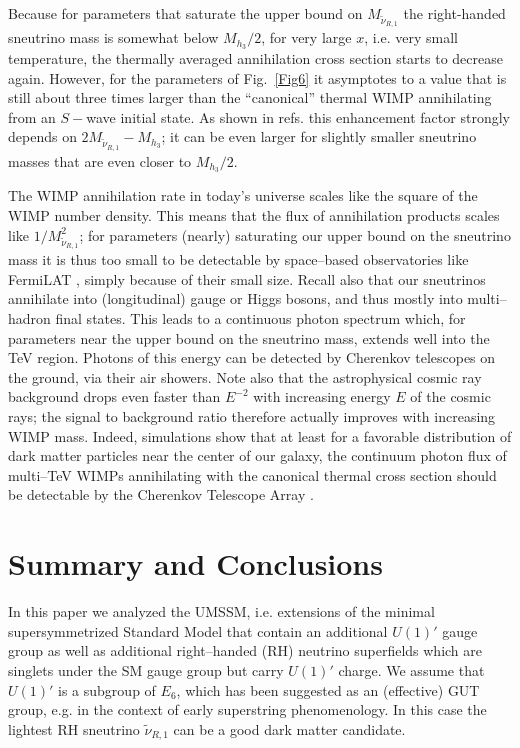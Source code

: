 \documentclass[a4paper,11pt]{article}
\begin{document}
Because for parameters that saturate the upper bound on $M_{\tilde{\nu}_{R,1}}$ the right-handed sneutrino mass is
somewhat below $M_{h_3}/2$, for very large $x$, i.e. very small
temperature, the thermally averaged annihilation cross section starts to
decrease again. However, for the parameters of Fig.~\ref{Fig6} it
asymptotes to a value that is still about three times larger than the
``canonical'' thermal WIMP annihilating from an $S-$wave initial state. As
shown in refs. \cite{Ibe:2008ye, Guo:2009aj} this enhancement factor
strongly depends on $2 M_{\tilde \nu_{R,1}} - M_{h_3}$; it can be even larger
for slightly smaller sneutrino masses that are even closer to $M_{h_3}/2$.

The WIMP annihilation rate in today's universe scales like the square
of the WIMP number density. This means that the flux of annihilation
products scales like $1/M^2_{\tilde \nu_{R,1}}$; for parameters
(nearly) saturating our upper bound on the sneutrino mass it is thus
too small to be detectable by space--based observatories like FermiLAT
\cite{Ackermann:2015zua}, simply because of their small size.  Recall
also that our sneutrinos annihilate into (longitudinal) gauge or Higgs
bosons, and thus mostly into multi--hadron final states. This leads to
a continuous photon spectrum which, for parameters near the upper
bound on the sneutrino mass, extends well into the TeV region. Photons
of this energy can be detected by Cherenkov telescopes on the ground,
via their air showers. Note also that the astrophysical cosmic ray
background drops even faster than $E^{-2}$ with increasing energy $E$
of the cosmic rays; the signal to background ratio therefore actually
improves with increasing WIMP mass. Indeed, simulations show that at
least for a favorable distribution of dark matter particles near the
center of our galaxy, the continuum photon flux of multi--TeV WIMPs
annihilating with the canonical thermal cross section should be
detectable by the Cherenkov Telescope Array \cite{Carr:2015hta}.

\section{Summary and Conclusions}  
\label{section5}

In this paper we analyzed the UMSSM, i.e. extensions of the minimal
supersymmetrized Standard Model that contain an additional $U(1)'$
gauge group as well as additional right--handed (RH) neutrino
superfields which are singlets under the SM gauge group but carry
$U(1)'$ charge. We assume that $U(1)'$ is a subgroup of $E_6$, which
has been suggested as an (effective) GUT group, e.g. in the context of
early superstring phenomenology. In this case the lightest RH
sneutrino $\tilde \nu_{R,1}$ can be a good dark matter candidate.
\end{document}
